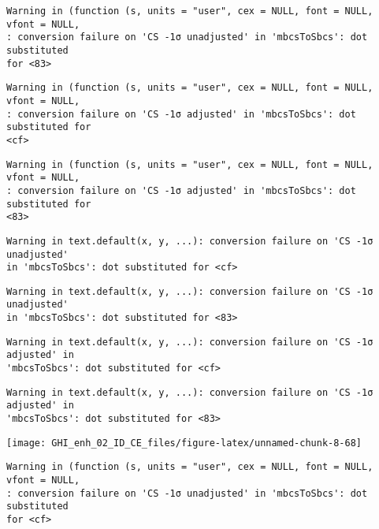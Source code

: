 \documentclass[
  10pt,
  a4paper,oneside]{article}
\begin{document}
\begin{verbatim}
Warning in (function (s, units = "user", cex = NULL, font = NULL, vfont = NULL,
: conversion failure on 'CS -1σ unadjusted' in 'mbcsToSbcs': dot substituted
for <83>
\end{verbatim}

\begin{verbatim}
Warning in (function (s, units = "user", cex = NULL, font = NULL, vfont = NULL,
: conversion failure on 'CS -1σ adjusted' in 'mbcsToSbcs': dot substituted for
<cf>
\end{verbatim}

\begin{verbatim}
Warning in (function (s, units = "user", cex = NULL, font = NULL, vfont = NULL,
: conversion failure on 'CS -1σ adjusted' in 'mbcsToSbcs': dot substituted for
<83>
\end{verbatim}

\begin{verbatim}
Warning in text.default(x, y, ...): conversion failure on 'CS -1σ unadjusted'
in 'mbcsToSbcs': dot substituted for <cf>
\end{verbatim}

\begin{verbatim}
Warning in text.default(x, y, ...): conversion failure on 'CS -1σ unadjusted'
in 'mbcsToSbcs': dot substituted for <83>
\end{verbatim}

\begin{verbatim}
Warning in text.default(x, y, ...): conversion failure on 'CS -1σ adjusted' in
'mbcsToSbcs': dot substituted for <cf>
\end{verbatim}

\begin{verbatim}
Warning in text.default(x, y, ...): conversion failure on 'CS -1σ adjusted' in
'mbcsToSbcs': dot substituted for <83>
\end{verbatim}

\begin{center}\texttt{[image: GHI\_enh\_02\_ID\_CE\_files/figure-latex/unnamed-chunk-8-68]} \end{center}

\begin{verbatim}
Warning in (function (s, units = "user", cex = NULL, font = NULL, vfont = NULL,
: conversion failure on 'CS -1σ unadjusted' in 'mbcsToSbcs': dot substituted
for <cf>
\end{verbatim}
\end{document}
